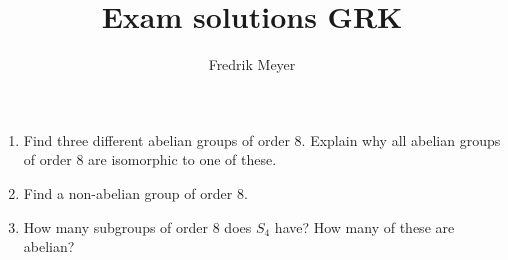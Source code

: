 \documentclass[11pt, english]{article}
\begin{document}
\title{Exam solutions GRK}
\author{Fredrik Meyer}
\maketitle 

\begin{exc}[Eksamen 2008, 1]
\begin{enumerate}
	\item Find three different abelian groups of order $8$. Explain why all abelian groups of order $8$ are isomorphic to one of these.
	\item Find a non-abelian group of order $8$.
	\item How many subgroups of order $8$ does $S_4$ have? How many of these are abelian?
\end{enumerate}
\end{exc}
\end{document}
